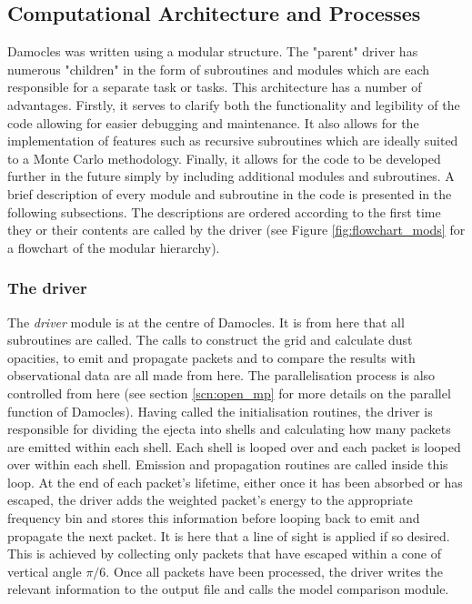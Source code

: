 	
	\subsection{Computational Architecture and Processes}
	Damocles was written using a modular structure.  The "parent" driver has numerous "children" in the form of subroutines and modules which are each responsible for a separate task or tasks.  This architecture has a number of advantages.  Firstly, it serves to clarify both the functionality and legibility of the code allowing for easier debugging and maintenance.  It also allows for the implementation of features such as recursive subroutines which are ideally suited to a Monte Carlo methodology.  Finally, it allows for the code to be developed further in the future simply by including additional modules and subroutines.  A brief description of every module and subroutine in the code is presented in the following subsections.  The descriptions are ordered according to the first time they or their contents are called by the driver (see Figure \ref{fig:flowchart_mods} for a flowchart of the modular hierarchy).
	

		\subsubsection{The driver}
		The \textit{driver} module is at the centre of Damocles.  It is from here that all subroutines are called.  The calls to construct the grid and calculate dust opacities, to emit and propagate packets and to compare the results with observational data are all made from here.  The parallelisation process is also controlled from here (see section \ref{scn:open_mp} for more details on the parallel function of Damocles).  Having called the initialisation routines, the driver is responsible for dividing the ejecta into shells and calculating how many packets are emitted within each shell.  Each shell is looped over and each packet is looped over within each shell. Emission and propagation routines are called inside this loop.  At the end of each packet's lifetime, either once it has been absorbed or has escaped, the driver adds the weighted packet's energy to the appropriate frequency bin and stores this information before looping back to emit and propagate the next packet.  It is here that a line of sight is applied if so desired.  This is achieved by collecting only packets that have escaped within a cone of vertical angle $\pi/6$.  Once all packets have been processed, the driver writes the relevant information to the output file and calls the model comparison module.  
	

